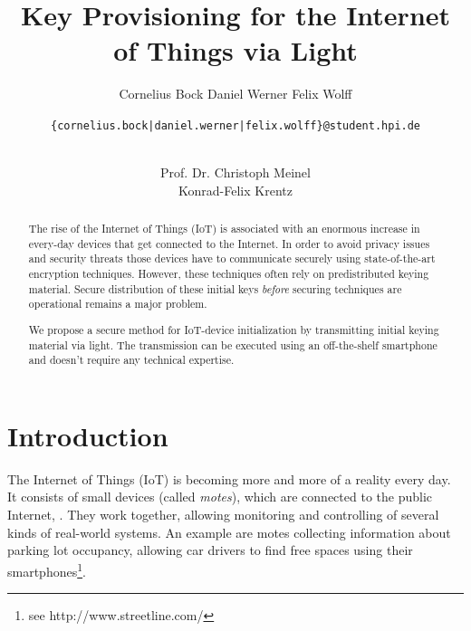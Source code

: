 \documentclass{sig-alternate} %
\begin{document}
\title{Key Provisioning for the Internet of Things via Light}


\author{
\alignauthor
Cornelius Bock
%
\alignauthor
Daniel Werner
%
\alignauthor
Felix Wolff
%
\and
\texttt{\{cornelius.bock|daniel.werner|felix.wolff\}@student.hpi.de} \\ \\
\and
\alignauthor
Prof. Dr. Christoph Meinel\\
%
\alignauthor
Konrad-Felix Krentz\\
}

\maketitle

\begin{abstract}
The rise of the Internet of Things (IoT) is associated with an enormous increase in every-day devices that get connected to the Internet.
In order to avoid privacy issues and security threats those devices have to communicate securely using state-of-the-art encryption techniques.
However, these techniques often rely on predistributed keying material.
Secure distribution of these initial keys \textit{before} securing techniques are operational remains a major problem.

We propose a secure method for IoT-device initialization by transmitting initial keying material via light.
The transmission can be executed using an off-the-shelf smartphone and doesn't require any technical expertise.
\end{abstract}




\section{Introduction}
\label{sec:introduction}

The Internet of Things (IoT) is becoming more and more of a reality every day.
It consists of small devices (called \textit{motes}), which are connected to the public Internet, \cite{atzori2010internet}.
They work together, allowing monitoring and controlling of several kinds of real-world systems.
An example are motes collecting information about parking lot occupancy, allowing car drivers to find free spaces using their smartphones\footnote{see http://www.streetline.com/}.
\end{document}
